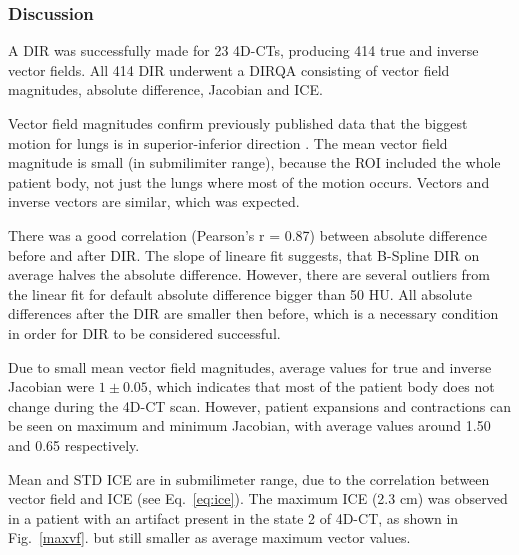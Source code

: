 \documentclass[type=dr, dr=rernat, accentcolor=tud7b,colorbacktitle, bigchapter, openright, twoside, 12pt ]{tudthesis}
\begin{document}
\newpage
\subsubsection{Discussion}
A DIR was successfully made for 23 4D-CTs, producing 414 true and inverse vector fields. All 414 DIR underwent a DIRQA consisting of vector field magnitudes, absolute difference, Jacobian and ICE.

Vector field magnitudes confirm previously published data that the biggest motion for lungs is in superior-inferior direction \cite{Seppenwoolde2002, Britton2007, Liu2007}. The mean vector field magnitude is small (in submilimiter range), 
because the ROI included the whole patient body, not just the lungs where most of the motion occurs. Vectors and inverse vectors are similar, which was expected.

There was a good correlation (Pearson's r = 0.87) between absolute difference before and after DIR. The slope of lineare fit suggests, that B-Spline DIR on average halves the absolute difference. However, there are several outliers from the
linear fit for default absolute difference bigger than 50 HU. All absolute differences after the DIR are smaller then before, which is a necessary condition in order for DIR to be considered successful.


Due to small mean vector field magnitudes, average values for true and inverse Jacobian were $1\pm0.05$, which indicates that most of the patient body does not change during the 4D-CT
scan. However, patient expansions and contractions can be seen on maximum and minimum Jacobian, with average values around 1.50 and 0.65 respectively. 

Mean and STD ICE are in submilimeter range, due to the correlation between vector field and ICE (see Eq.~\ref{eq:ice}). The maximum ICE (2.3 cm) was observed in a patient with 
an artifact present in the state 2 of 4D-CT, as shown in Fig.~\ref{maxvf}.
but still smaller as average maximum vector values. 
\end{document}
